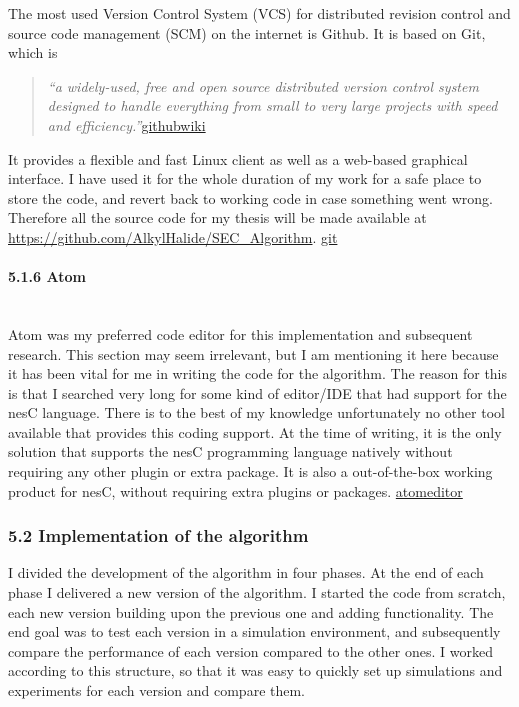 The most used Version Control System (VCS) for distributed revision
control and source code management (SCM) on the internet is Github. It
is based on Git, which is

\begin{quote}
\emph{``a widely-used, free and open source distributed version control
system designed to handle everything from small to very large projects
with speed and
efficiency.''}\href{https://en.wikipedia.org/wiki/GitHub}{githubwiki}
\end{quote}

It provides a flexible and fast Linux client as well as a web-based
graphical interface. I have used it for the whole duration of my work
for a safe place to store the code, and revert back to working code in
case something went wrong. Therefore all the source code for my thesis
will be made available at
\url{https://github.com/AlkylHalide/SEC_Algorithm}.
\href{https://git-scm.com/}{git}

\paragraph{5.1.6 Atom\\\\}\label{atom}

Atom was my preferred code editor for this implementation and subsequent
research. This section may seem irrelevant, but I am mentioning it here
because it has been vital for me in writing the code for the algorithm.
The reason for this is that I searched very long for some kind of
editor/IDE that had support for the nesC language. There is to the best
of my knowledge unfortunately no other tool available that provides this
coding support. At the time of writing, it is the only solution that
supports the nesC programming language natively without requiring any
other plugin or extra package. It is also a out-of-the-box working
product for nesC, without requiring extra plugins or packages.
\href{https://atom.io/}{atomeditor}

\subsubsection{5.2 Implementation of the
algorithm}\label{implementation-of-the-algorithm}

I divided the development of the algorithm in four phases. At the end of
each phase I delivered a new version of the algorithm. I started the
code from scratch, each new version building upon the previous one and
adding functionality. The end goal was to test each version in a
simulation environment, and subsequently compare the performance of each
version compared to the other ones. I worked according to this
structure, so that it was easy to quickly set up simulations and
experiments for each version and compare them.

